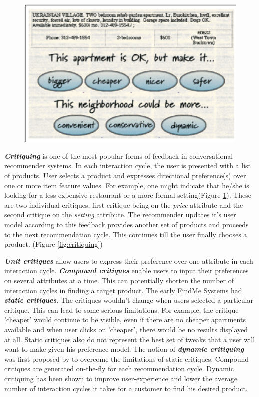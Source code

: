 \begin{figure}
\begin{minipage}{.5\textwidth}
  \includegraphics[width=1\linewidth]{figures-bharath/rentMe.png}
  \label{fig:rentMe}
\end{minipage}
\end{figure}
\textit{\textbf{Critiquing}} is one of the most popular forms of feedback in conversational recommender systems. In each interaction cycle, the user is presented with a list of products.
User selects a product and expresses directional preference(s) over one or more item feature values. 
For example, one might indicate that he/she is looking for a less expensive restaurant or a more formal setting(Figure \ref{fig:rentMe}). These are two individual critiques, first critique being on the \textit{price} attribute and the second critique on the \textit{setting} attribute. 
The recommender updates it's user model according to this feedback provides another set of products and proceeds to the next recommendation cycle. This continues till the user finally chooses a product. (Figure \ref{fig:critiquing})

\textit{\textbf{Unit critiques}} allow users to express their preference over one attribute in each interaction cycle. \textit{\textbf{Compound critiques}} enable users to input their preferences on several attributes at a time. This can potentially shorten the number of interaction cycles in finding a target product.
The early FindMe Systems \cite{burkeEarlierSystems} had \textit{\textbf{static critiques}}. The critiques wouldn't change when users selected a particular critique. 
This can lead to some serious limitations.
For example, the critique 'cheaper' would continue to be visible, even if there are no cheaper apartments available and when user clicks on 'cheaper', there would be no results displayed at all.
Static critiques also do not represent the best set of tweaks that a user will want to make given his preference model.
The notion of \textit{\textbf{dynamic critiquing}} was first proposed by \cite{mccarthy2004dynamic} to overcome the limitations of static critiques.
Compound critiques are generated on-the-fly for each recommendation cycle. Dynamic critiquing has been shown to improve user-experience and lower the average number of interaction cycles it takes for a customer to find his desired product.

